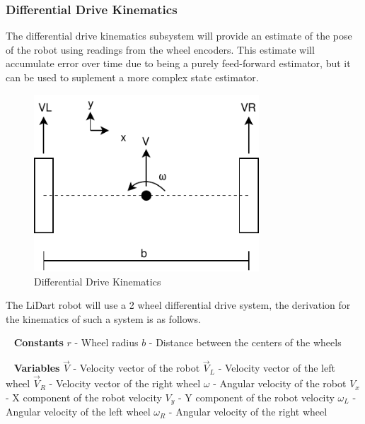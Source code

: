 \documentclass[12pt]{article}
\begin{document}
\subsubsection{Differential Drive Kinematics}
The differential drive kinematics subsystem will provide an estimate of the pose of the robot using readings from
the wheel encoders. This estimate will accumulate error over time due to being a purely feed-forward estimator, but
it can be used to suplement a more complex state estimator.

\begin{figure}[H]
\begin{center}
    \includegraphics[width=0.75\textwidth]{Figures/Differential Drive Kinematics.pdf}
\caption{Differential Drive Kinematics}
\label{Fig_DifferentialDriveKinematics} 
\end{center}
\end{figure}

The LiDart robot will use a 2 wheel differential drive system, the derivation for the kinematics of such a system is as follows.

\ \newline
\textbf{Constants}
\newline $r$ - Wheel radius
\newline $b$ - Distance between the centers of the wheels

\ \newline
\textbf{Variables}
\newline $\vec{V}$ - Velocity vector of the robot
\newline $\vec{V}_L$ - Velocity vector of the left wheel
\newline $\vec{V}_R$ - Velocity vector of the right wheel
\newline $\omega$ - Angular velocity of the robot 
\newline $V_x$ - X component of the robot velocity
\newline $V_y$ - Y component of the robot velocity
\newline $\omega_L$ - Angular velocity of the left wheel 
\newline $\omega_R$ - Angular velocity of the right wheel
\end{document}
